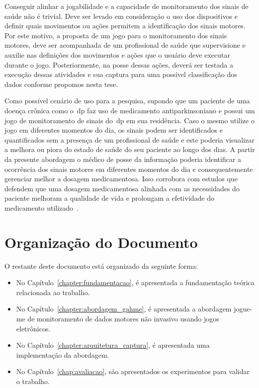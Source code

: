Conseguir alinhar a jogabilidade e a capacidade de monitoramento dos sinais de saúde não é trivial. Deve ser levado em consideração o uso dos dispositivos e definir quais movimentos ou ações permitem a identificação dos sinais motores. Por este motivo, a proposta de um jogo para o monitoramento dos sinais motores, deve ser acompanhada de um profissional de saúde que supervisione e auxilie nas definições dos movimentos e ações que o usuário deve executar durante o jogo. Posteriormente, na posse dessas ações, deverá ser testada a execução dessas atividades e sua captura para uma possível classificação dos dados conforme propomos nesta tese.

Como possível cenário de uso para a pesquisa, supondo que um paciente de uma doença crônica como o~\ac{dp} faz uso de medicamento antiparkinsoniano e possui um jogo de monitoramento de sinais do~\ac{dp} em sua residência. Caso o mesmo utilize o jogo em diferentes momentos do dia, os sinais podem ser identificados e quantificados sem a presença de um profissional de saúde e este poderia visualizar a melhora ou piora do estado de saúde do seu paciente ao longo dos dias. A partir da presente abordagem o médico de posse da informação poderia identificar a ocorrência dos sinais motores em diferentes momentos do dia e consequentemente gerenciar melhor a dosagem medicamentosa. Isso corrobora com estudos que defendem que uma dosagem medicamentosa alinhada com as necessidades do paciente melhoram a qualidade de vida e prolongam a efetividade do medicamento utilizado~\cite{rodrigues2006}.

\section{Organização do Documento}
O restante deste documento está organizado da seguinte forma:
\begin{itemize}
	\item No Capítulo~\ref{chapter:fundamentacao}, é apresentada a fundamentação teórica relacionada ao trabalho.
	\item No Capítulo~\ref{chapter:abordagem_gahme}, é apresentada a abordagem \ac{jogue-me} de monitoramento de dados motores não invasivo usando jogos eletrônicos.
	\item No Capítulo~\ref{chapter:arquitetura_captura}, é apresentada uma implementação da abordagem.
	\item No Capítulo~\ref{chap:avaliacao}, são apresentados os experimentos para validar o trabalho.
\end{itemize}
